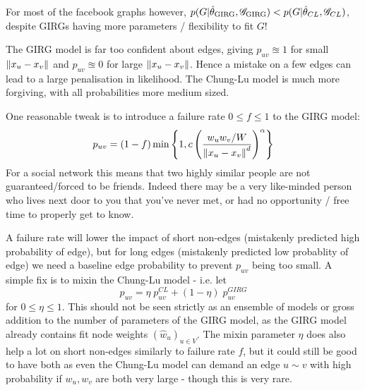 For most of the facebook graphs however, $p(G | \hat{\theta}_{\mathrm{GIRG}}, \mathscr{G}_{\mathrm{GIRG}}) < p(G | \hat{\theta}_{CL}, \mathscr{G}_{CL})$, despite GIRGs having more parameters / flexibility to fit $G$!

The GIRG model is far too confident about edges, giving $p_{uv} \approxeq 1$ for small $\left\lVert x_u - x_v\right\rVert$ and $p_{uv} \approxeq 0$ for large $\left\lVert x_u - x_v\right\rVert$. Hence a mistake on a few edges can lead to a large penalisation in likelihood. The Chung-Lu model is much more forgiving, with all probabilities more medium sized. 


One reasonable tweak is to introduce a failure rate $0 \leq f \leq 1$ to the GIRG model: 
\begin{equation}
  p_{uv} = (1 - f) \min \left \{ 
    1,
    c \left (
        \frac{w_u w_v / W}{\left\lVert x_u - x_v\right\rVert^d}
    \right )^\alpha    
\right \}
\end{equation}
For a social network this means that two highly similar people are not guaranteed/forced to be friends. Indeed there may be a very like-minded person who lives next door to you that you've never met, or had no opportunity / free time to properly get to know.

A failure rate will lower the impact of short non-edges (mistakenly predicted high probability of edge), but for long edges (mistakenly predicted low probablity of edge) we need a baseline edge probability to prevent $p_{uv}$ being too small. A simple fix is to mixin the Chung-Lu model - i.e. let 
\begin{equation}
  p_{uv} = \eta \; p_{uv}^{CL} + (1 - \eta) \; p_{uv}^{GIRG}
\end{equation}
for $0 \leq \eta \leq 1$. This should not be seen strictly as an ensemble of models or gross addition to the number of parameters of the GIRG model, as the GIRG model already contains fit node weights $(\hat{w}_u)_{u \in V}$. The mixin parameter $\eta$ does also help a lot on short non-edges similarly to failure rate $f$, but it could still be good to have both as even the Chung-Lu model can demand an edge $u \sim v$ with high probability if $w_u, w_v$ are both very large - though this is very rare.

